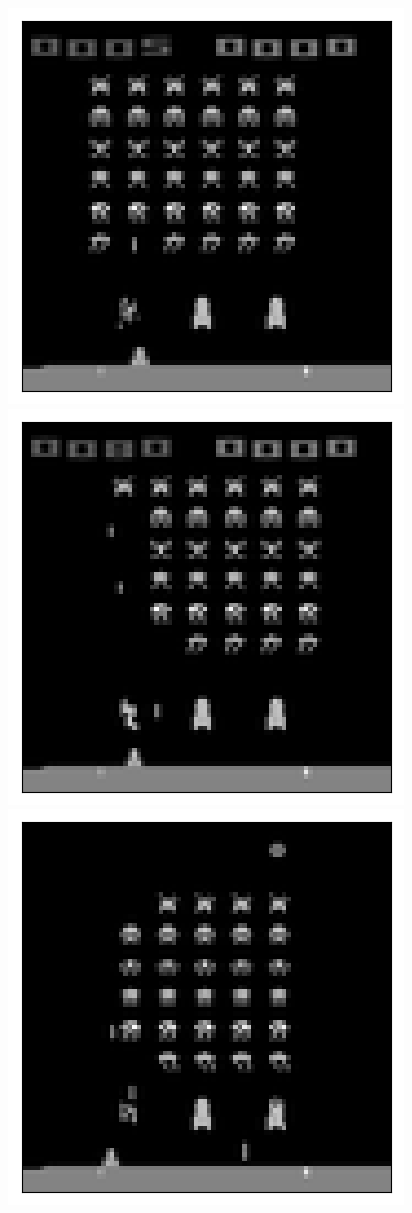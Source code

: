 \begin{figure}[h!]
\centering
\captionsetup{justification=centering}
\begin{multicols}{4}
    \includegraphics[scale=0.4]{figures/results/latent_image/beta_1_sample_0_original.png}
    \includegraphics[scale=0.4]{figures/results/latent_image/beta_1_sample_1_original.png}
    \includegraphics[scale=0.4]{figures/results/latent_image/beta_1_sample_2_original.png}

\end{multicols}
\end{figure}

